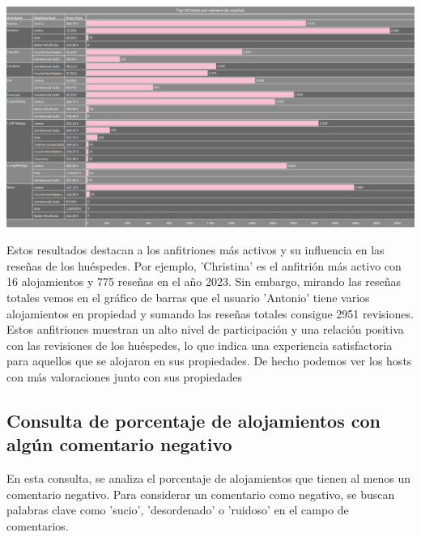 \begin{center}
    \centering
    \includegraphics[width=1\textwidth]{capturas/11.png}
\end{center}
Estos resultados destacan a los anfitriones más activos y su influencia en las reseñas de los huéspedes. Por ejemplo, 'Christina' es el anfitrión más activo con 16 alojamientos y 775 reseñas en el año 2023. Sin embargo, mirando las reseñas totales vemos en el gráfico de barras que el usuario 'Antonio' tiene varios alojamientos en propiedad y sumando las reseñas totales consigue 2951 revisiones.\\Estos anfitriones muestran un alto nivel de participación y una relación positiva con las revisiones de los huéspedes, lo que indica una experiencia satisfactoria para aquellos que se alojaron en sus propiedades.
De hecho podemos ver los hosts con más valoraciones junto con sus propiedades

\subsection{Consulta de porcentaje de alojamientos con algún comentario negativo}
En esta consulta, se analiza el porcentaje de alojamientos que tienen al menos un comentario negativo. Para considerar un comentario como negativo, se buscan palabras clave como 'sucio', 'desordenado' o 'ruidoso' en el campo de comentarios.
\begin{table}[h]
\centering
{}
\caption{Porcentaje de alojamientos con comentarios negativos}
\end{table}

